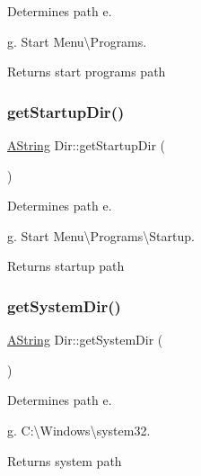 Determines path e. 

g. Start Menu\textbackslash{}\+Programs. \begin{DoxyReturn}{Returns}
start programs path 
\end{DoxyReturn}
\mbox{\label{class_dir_a17a1c814df49732ac4002a122476bf26}} 
\subsubsection{\texorpdfstring{getStartupDir()}{getStartupDir()}}
{\footnotesize\ttfamily \mbox{\hyperlink{class_a_string}{A\+String}} Dir\+::get\+Startup\+Dir (\begin{DoxyParamCaption}{ }\end{DoxyParamCaption})\hspace{0.3cm}{\ttfamily [static]}}



Determines path e. 

g. Start Menu\textbackslash{}\+Programs\textbackslash{}\+Startup. \begin{DoxyReturn}{Returns}
startup path 
\end{DoxyReturn}
\mbox{\label{class_dir_a307bfc5297772f851f8dd1491974f80c}} 
\subsubsection{\texorpdfstring{getSystemDir()}{getSystemDir()}}
{\footnotesize\ttfamily \mbox{\hyperlink{class_a_string}{A\+String}} Dir\+::get\+System\+Dir (\begin{DoxyParamCaption}{ }\end{DoxyParamCaption})\hspace{0.3cm}{\ttfamily [static]}}



Determines path e. 

g. C\+:\textbackslash{}\+Windows\textbackslash{}system32. \begin{DoxyReturn}{Returns}
system path 
\end{DoxyReturn}
\mbox{\label{class_dir_ad5830bd5aeb84c7c15751e1d49dbcde0}} 
